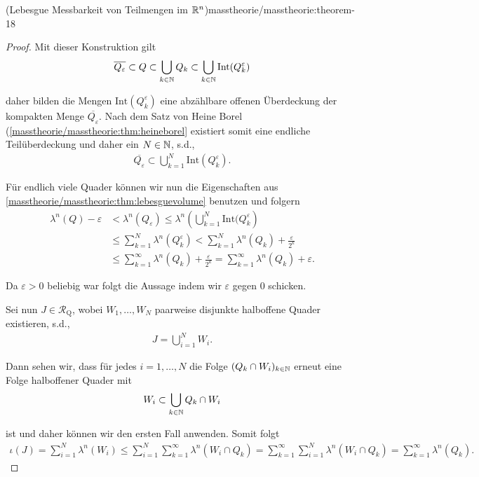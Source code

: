 \begin{theorem}{(Lebesgue Messbarkeit von Teilmengen im \protect\(\mathbb{R}^n\protect\))}{masstheorie/masstheorie:theorem-18}
\begin{proof}
\par
Mit dieser Konstruktion gilt
\begin{align*}
\overline{Q_\varepsilon} \subset Q\subset \bigcup_{k\in\mathbb{N}} Q_k \subset 
\bigcup_{k\in\mathbb{N}}\text{Int}(Q_k^\varepsilon)
\end{align*}
\par
daher bilden die Mengen \(\text{Int}(Q_k^\varepsilon)\) eine abzählbare offenen Überdeckung der kompakten Menge \(\overline{Q_\varepsilon}\).
Nach dem Satz von Heine Borel (\cref{masstheorie/masstheorie:thm:heineborel}  existiert somit eine endliche Teilüberdeckung und daher ein \(N\in\mathbb{N}\), s.d.,
\begin{align*}
\overline{Q_\varepsilon}\subset \bigcup_{k=1}^N\text{Int}(Q_k^\varepsilon).
\end{align*}
\par
Für endlich viele Quader können wir nun die Eigenschaften aus \cref{masstheorie/masstheorie:thm:lebesguevolume} benutzen und folgern
\begin{align*}
\lambda^n(Q) -\varepsilon &< \lambda^n(Q_\varepsilon) \leq 
\lambda^n\left(\bigcup_{k=1}^N\text{Int}(Q_k^\varepsilon\right) 
\\&\leq 
\sum_{k=1}^N \lambda^n(Q_k^\varepsilon) < 
\sum_{k=1}^N \lambda^n(Q_k) + \frac{\varepsilon}{2^k} 
\\&\leq
\sum_{k=1}^\infty \lambda^n(Q_k) + \frac{\varepsilon}{2^k} = \sum_{k=1}^\infty \lambda^n(Q_k) +\varepsilon.
\end{align*}
\par
Da \(\varepsilon>0\) beliebig war folgt die Aussage indem wir \(\varepsilon\) gegen \(0\) schicken.

\par
Sei nun \(J\in\mathcal{R}_{\text{Q}}\), wobei \(W_1,\ldots,W_N\) paarweise disjunkte halboffene Quader existieren, s.d.,
\begin{align*}
J = \bigcup_{i=1}^N W_i.
\end{align*}
\par
Dann sehen wir, dass für jedes \(i=1,\ldots,N\) die Folge \((Q_k\cap W_i)_{k\in\mathbb{N}}\) erneut eine Folge halboffener Quader mit
\begin{align*}
W_i \subset \bigcup_{k\in\mathbb{N}} Q_k\cap W_i
\end{align*}
\par
ist und daher können wir den ersten Fall anwenden. Somit folgt
\begin{align*}
\iota(J) = \sum_{i=1}^N \lambda^n(W_i) \leq \sum_{i=1}^N \sum_{k=1}^\infty \lambda^n(W_i\cap Q_k) = 
\sum_{k=1}^\infty\sum_{i=1}^N \lambda^n(W_i\cap Q_k) = \sum_{k=1}^\infty \lambda^n(Q_k).
\end{align*}\end{proof}


\end{theorem}
